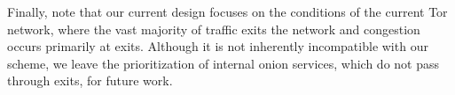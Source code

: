Finally, note that our current design focuses on the conditions of the current Tor network, where the vast majority of traffic exits the network and congestion occurs primarily at exits.
Although it is not inherently incompatible with our scheme, we leave the prioritization of internal onion services, which do not pass through exits, for future work.

